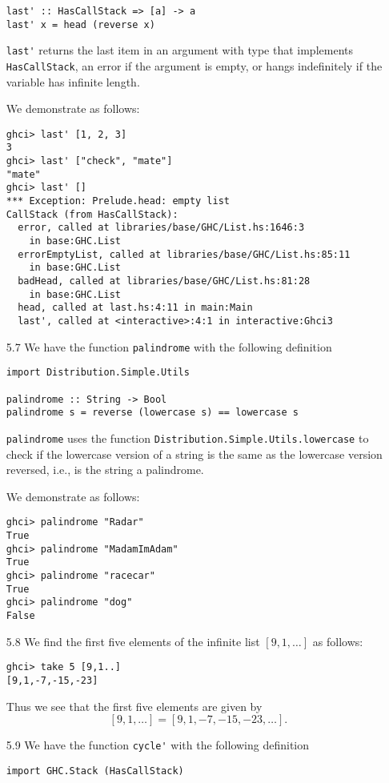 \documentclass{article}
\begin{document}
\begin{itemize}
\begin{verbatim}
last' :: HasCallStack => [a] -> a 
last' x = head (reverse x)
        \end{verbatim}
        \verb|last'| returns the last item in an argument with type that implements 
        \verb|HasCallStack|, an error if the argument is empty, or hangs indefinitely
        if the variable has infinite length.\par
        \qquad We demonstrate as follows:
        \begin{verbatim}
ghci> last' [1, 2, 3]
3
ghci> last' ["check", "mate"]
"mate"
ghci> last' []
*** Exception: Prelude.head: empty list
CallStack (from HasCallStack):
  error, called at libraries/base/GHC/List.hs:1646:3 
    in base:GHC.List
  errorEmptyList, called at libraries/base/GHC/List.hs:85:11 
    in base:GHC.List
  badHead, called at libraries/base/GHC/List.hs:81:28 
    in base:GHC.List
  head, called at last.hs:4:11 in main:Main
  last', called at <interactive>:4:1 in interactive:Ghci3
        \end{verbatim}
        \item[5.7] We have the function \verb|palindrome| with the following 
        definition 
        \begin{verbatim}
import Distribution.Simple.Utils

palindrome :: String -> Bool
palindrome s = reverse (lowercase s) == lowercase s 
        \end{verbatim}
        \verb|palindrome| uses the function 
        \verb|Distribution.Simple.Utils.lowercase| to check if the lowercase version 
        of a string is the same as the lowercase version reversed, i.e., is the 
        string a palindrome.\par
        \qquad We demonstrate as follows:
        \begin{verbatim}
ghci> palindrome "Radar"
True
ghci> palindrome "MadamImAdam"
True
ghci> palindrome "racecar"
True
ghci> palindrome "dog"
False
        \end{verbatim}
        \item[5.8] We find the first five elements of the infinite list 
        $[9, 1, \ldots]$ as follows:
        \begin{verbatim}
ghci> take 5 [9,1..]
[9,1,-7,-15,-23]
        \end{verbatim}
        Thus we see that the first five elements are given by
        \[
            [9, 1, \ldots] = [9, 1, -7, -15, -23, \ldots].
        \]
        \item[5.9] We have the function \verb|cycle'| with the following 
        definition 
        \begin{verbatim}
import GHC.Stack (HasCallStack)


\end{verbatim}
\end{itemize}
\end{document}

